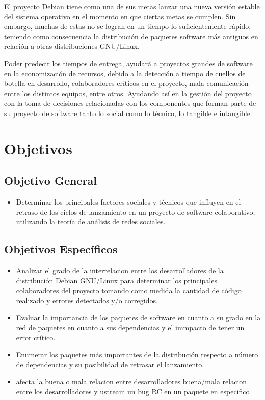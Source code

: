 \documentclass[12pt]{report}
\begin{document}
El  proyecto Debian  tiene  como una  de sus  metas  lanzar una  nueva
versión estable  del sistema  operativo en el  momento en  que ciertas
metas se  cumplen.  Sin embargo,  muchas de estas  no se logran  en un
tiempo  lo  suficientemente  rápido,  teniendo  como  consecuencia  la
distribución de  paquetes software  más antiguos  en relación  a otras
distribuciones GNU/Linux.

Poder predecir los tiempos de  entrega, ayudará a proyectos grandes de
software  en la  economización de  recursos, debido  a la  detección a
tiempo de cuellos de botella  en desarrollo, colaboradores críticos en
el  proyecto, mala  comunicación  entre los  distintos equipos,  entre
otros.   Ayudando así  en  la  gestión del  proyecto  con  la toma  de
decisiones relacionadas  con los  componentes que  forman parte  de su
proyecto de  software tanto lo social  como lo técnico, lo  tangible e
intangible.

\section*{Objetivos}  %
\subsection{Objetivo General}
\begin{itemize}
\item  Determinar los  principales  factores sociales  y técnicos  que
influyen en el retraso de los  ciclos de lanzamiento en un proyecto de
software  colaborativo,  utilizando la  teoría  de  análisis de  redes
sociales.
\end{itemize}

\subsection{Objetivos Específicos}
\begin{itemize}
\item Analizar el grado de  la interrelacion entre los desarrolladores
de la  distribución Debian  GNU/Linux para determinar  los principales
colaboradores del proyecto  tomando como medida la  cantidad de código
realizado y errores detectados y/o corregidos.
\item Evaluar la  importancia de los paquetes de software  en cuanto a
su grado  en la  red de  paquetes en  cuanto a  sus dependencias  y el
immpacto de tener un error crítico.
\item  Enumerar  los  paquetes  más  importantes  de  la  distribución
respecto  a número  de dependencias  y su  posibilidad de  retrasar el
lanzamiento.
\item %
afecta la buena o mala  relacion entre desarrolladores %
buena/mala relacion  entre los desarrolladores y  ustream %
un bug RC en un paquete en especifico

\end{itemize}
\end{document}
